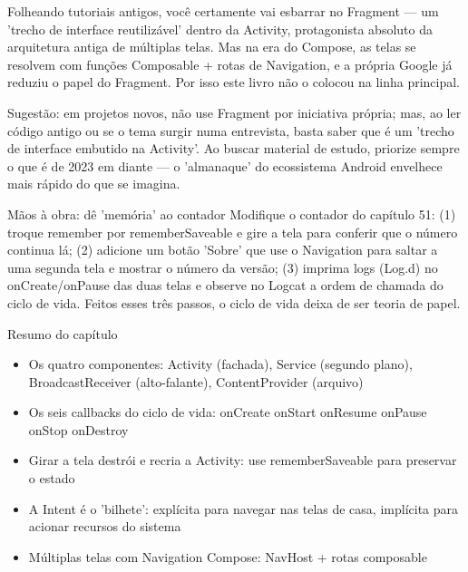 
Folheando tutoriais antigos, você certamente vai esbarrar no Fragment — um 'trecho de interface reutilizável' dentro da Activity, protagonista absoluto da arquitetura antiga de múltiplas telas. Mas na era do Compose, as telas se resolvem com funções Composable + rotas de Navigation, e a própria Google já reduziu o papel do Fragment. Por isso este livro não o colocou na linha principal.

Sugestão: em projetos novos, não use Fragment por iniciativa própria; mas, ao ler código antigo ou se o tema surgir numa entrevista, basta saber que é um 'trecho de interface embutido na Activity'. Ao buscar material de estudo, priorize sempre o que é de 2023 em diante — o 'almanaque' do ecossistema Android envelhece mais rápido do que se imagina.

\begin{tcbpractice}{Mãos à obra: dê 'memória' ao contador}
Modifique o contador do capítulo 51: (1) troque remember por rememberSaveable e gire a tela para conferir que o número continua lá; (2) adicione um botão 'Sobre' que use o Navigation para saltar a uma segunda tela e mostrar o número da versão; (3) imprima logs (Log.d) no onCreate/onPause das duas telas e observe no Logcat a ordem de chamada do ciclo de vida. Feitos esses três passos, o ciclo de vida deixa de ser teoria de papel.

\end{tcbpractice}

\begin{tcbsummary}{Resumo do capítulo}
\begin{itemize}
  \item Os quatro componentes: Activity (fachada), Service (segundo plano), BroadcastReceiver (alto-falante), ContentProvider (arquivo)
  \item Os seis callbacks do ciclo de vida: onCreate onStart onResume onPause onStop onDestroy
  \item Girar a tela destrói e recria a Activity: use rememberSaveable para preservar o estado
  \item A Intent é o 'bilhete': explícita para navegar nas telas de casa, implícita para acionar recursos do sistema
  \item Múltiplas telas com Navigation Compose: NavHost + rotas composable
\end{itemize}

\end{tcbsummary}
